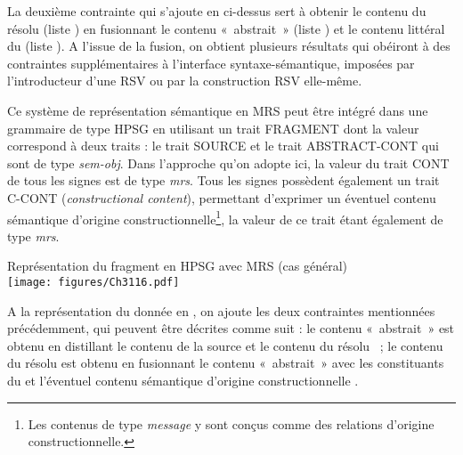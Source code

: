 La deuxième contrainte qui s’ajoute en  ci-dessus sert à obtenir le contenu du  résolu (liste ) en fusionnant le contenu «~abstrait~» (liste ) et le contenu littéral du  (liste ). A l’issue de la fusion, on obtient plusieurs résultats qui obéiront à des contraintes supplémentaires à l’interface syntaxe-sémantique, imposées par l’introducteur d’une RSV ou par la construction RSV elle-même.  

Ce système de représentation sémantique en MRS peut être intégré dans une grammaire de type HPSG en utilisant un trait FRAGMENT dont la valeur correspond à deux traits : le trait SOURCE et le trait ABSTRACT-CONT qui sont de type \textit{sem-obj}. Dans l’approche qu’on adopte ici, la valeur du trait CONT de tous les signes est de type \textit{mrs}. Tous les signes possèdent également un trait C-CONT (\textit{constructional content}), permettant d’exprimer un éventuel contenu sémantique d’origine constructionnelle\footnote{ Les contenus de type \textit{message} y sont conçus comme des relations d’origine constructionnelle.}, la valeur de ce trait étant également de type \textit{mrs}. 

\ea \label{ch3:ex116}
Représentation du fragment en HPSG avec MRS (cas général)\\
\texttt{[image: figures/Ch3116.pdf]}



\z

A la représentation du  donnée en , on ajoute les deux contraintes mentionnées précédemment, qui peuvent être décrites comme suit : le contenu «~abstrait~»  est obtenu en distillant le contenu de la source  et le contenu du  résolu ~; le contenu du  résolu  est obtenu en fusionnant le contenu «~abstrait~»  avec les constituants du   et l’éventuel contenu sémantique d’origine constructionnelle .  


